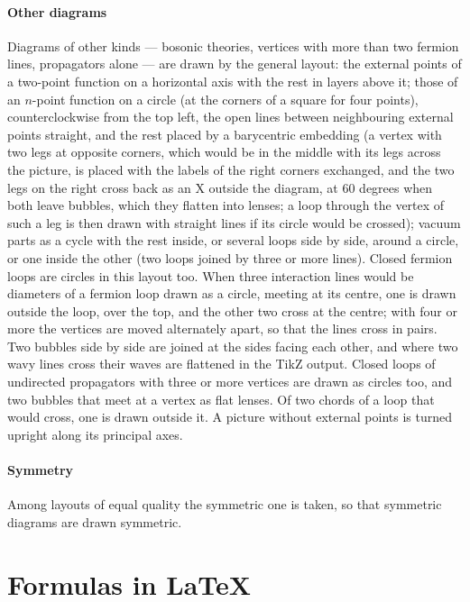 \documentclass[11pt,a4paper]{article}
\begin{document}
\paragraph{Other diagrams} Diagrams of other kinds --- bosonic theories, vertices with more than two fermion lines,
propagators alone --- are drawn by the general layout: the external points of a two-point function on
a horizontal axis with the rest in layers above it; those of an $n$-point function on a circle (at the corners of a
square for four points), counterclockwise from the top left, the open lines between neighbouring external points
straight, and the rest placed by a barycentric embedding (a vertex with two legs at opposite corners, which would be in
the middle with its legs across the picture, is placed with the labels of the right corners exchanged, and the two legs
on the right cross back as an X outside the diagram, at 60 degrees when both leave bubbles, which they flatten into
lenses; a loop through the vertex of such a leg is then drawn with straight lines if its circle would be crossed); vacuum parts as a cycle with the rest inside, or several loops
side by side, around a circle, or one inside the other (two loops joined by three or more lines). Closed fermion loops are
circles in this layout too. When three interaction lines would be diameters of a fermion loop drawn as a circle, meeting at
its centre, one is drawn outside the loop, over the top, and the other two cross at the centre; with four or more the vertices
are moved alternately apart, so that the lines cross in pairs. Two bubbles side by side are joined at the sides facing each other, and where two wavy lines
cross their waves are flattened in the TikZ output.
Closed loops of undirected propagators with three or more vertices are drawn as circles too, and two bubbles that meet
at a vertex as flat lenses. Of two chords of a loop that would cross, one is drawn outside it. A picture without external
points is turned upright along its principal axes.

\paragraph{Symmetry} Among layouts of equal quality the symmetric one is taken, so that symmetric diagrams are drawn
symmetric.

\section{Formulas in \LaTeX}\label{sec:latex}
\end{document}
